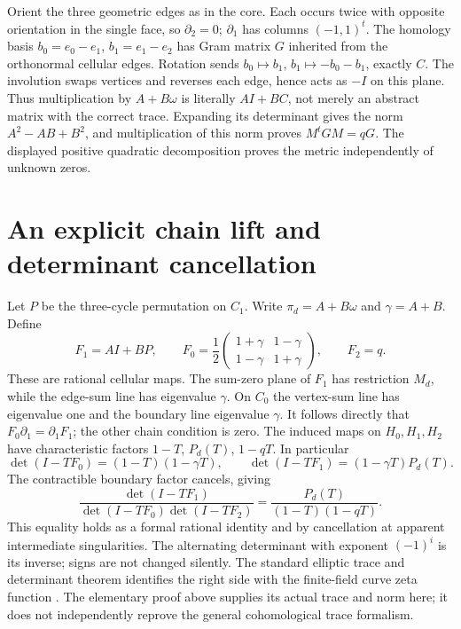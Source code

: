 \documentclass[11pt,oneside,openany]{book}
\theoremstyle{definition}\newtheorem{definition}[theorem]{Definition}
\theoremstyle{remark}\newtheorem{remark}[theorem]{Remark}
\begin{document}
Orient the three geometric edges as in the core. Each occurs twice with opposite orientation in the single face, so $\partial_2=0$; $\partial_1$ has columns $(-1,1)^t$. The homology basis $b_0=e_0-e_1$, $b_1=e_1-e_2$ has Gram matrix $G$ inherited from the orthonormal cellular edges. Rotation sends $b_0\mapsto b_1$, $b_1\mapsto-b_0-b_1$, exactly $C$. The involution swaps vertices and reverses each edge, hence acts as $-I$ on this plane. Thus multiplication by $A+B\omega$ is literally $AI+BC$, not merely an abstract matrix with the correct trace. Expanding its determinant gives the norm $A^2-AB+B^2$, and multiplication of this norm proves $M^tGM=qG$. The displayed positive quadratic decomposition proves the metric independently of unknown zeros.

\section{An explicit chain lift and determinant cancellation}
Let $P$ be the three-cycle permutation on $C_1$. Write $\pi_d=A+B\omega$ and $\gamma=A+B$. Define
\[
 F_1=AI+BP,\qquad
 F_0=\frac12\begin{pmatrix}1+\gamma&1-\gamma\\1-\gamma&1+\gamma\end{pmatrix},\qquad
 F_2=q.
\]
These are rational cellular maps. The sum-zero plane of $F_1$ has restriction $M_d$, while the edge-sum line has eigenvalue $\gamma$. On $C_0$ the vertex-sum line has eigenvalue one and the boundary line eigenvalue $\gamma$. It follows directly that $F_0\partial_1=\partial_1F_1$; the other chain condition is zero. The induced maps on $H_0,H_1,H_2$ have characteristic factors $1-T$, $P_d(T)$, $1-qT$. In particular
\[
 \det(I-TF_0)=(1-T)(1-\gamma T),\qquad
 \det(I-TF_1)=(1-\gamma T)P_d(T).
\]
The contractible boundary factor cancels, giving
\[
 \frac{\det(I-TF_1)}{\det(I-TF_0)\det(I-TF_2)}
 =\frac{P_d(T)}{(1-T)(1-qT)}.
\]
This equality holds as a formal rational identity and by cancellation at apparent intermediate singularities. The alternating determinant with exponent $(-1)^i$ is its inverse; signs are not changed silently. The standard elliptic trace and determinant theorem identifies the right side with the finite-field curve zeta function \cite{SGAFourHalf,DeligneWeilI}. The elementary proof above supplies its actual trace and norm here; it does not independently reprove the general cohomological trace formalism.
\end{document}

